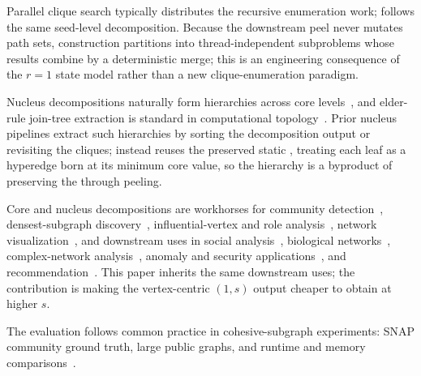 Parallel clique search typically distributes the recursive enumeration work; \paraBuild{} follows the same seed-level decomposition.
%
Because the downstream peel never mutates path sets, construction partitions into thread-independent subproblems whose results combine by a deterministic merge; this is an engineering consequence of the $r{=}1$ state model rather than a new clique-enumeration paradigm.

Nucleus decompositions naturally form hierarchies across core levels~\cite{nucleusSariyuce14,nuclearTWEB,fastHierarchy,sotaPrveHierarchy,sotaHierarchy}, and elder-rule join-tree extraction is standard in computational topology~\cite{edelsbrunner2010topology}.
%
Prior nucleus pipelines extract such hierarchies by sorting the decomposition output or revisiting the cliques; \buildHier{} instead reuses the preserved static \cpi{}, treating each leaf as a hyperedge born at its minimum core value, so the hierarchy is a byproduct of preserving the \cpi{} through peeling.

Core and nucleus decompositions are workhorses for community detection~\cite{communities_dec1,communities_dec2,communities_dec3,girvan2002community}, densest-subgraph discovery~\cite{dense_subgraph}, influential-vertex and role analysis~\cite{Identifying_influential,kempe2003maximizing,lu2016vital}, network visualization~\cite{network_visualization}, and downstream uses in social analysis~\cite{cohesive_subgraph_Social_Networks,apply_social_networks}, biological networks~\cite{cohesive_subgraph_protein_networks,apply_biological_networks_1}, complex-network analysis~\cite{cohesive_subgraph_complex_networks}, anomaly and security applications~\cite{akoglu2015graph,apply_cyber}, and recommendation~\cite{e-shipping_recommendation}.
%
This paper inherits the same downstream uses; the contribution is making the vertex-centric $(1,s)$ output cheaper to obtain at higher $s$.

The evaluation follows common practice in cohesive-subgraph experiments: SNAP community ground truth, large public graphs, and runtime and memory comparisons~\cite{communityFinder,NuclearCD,nuclearTWEB}.
